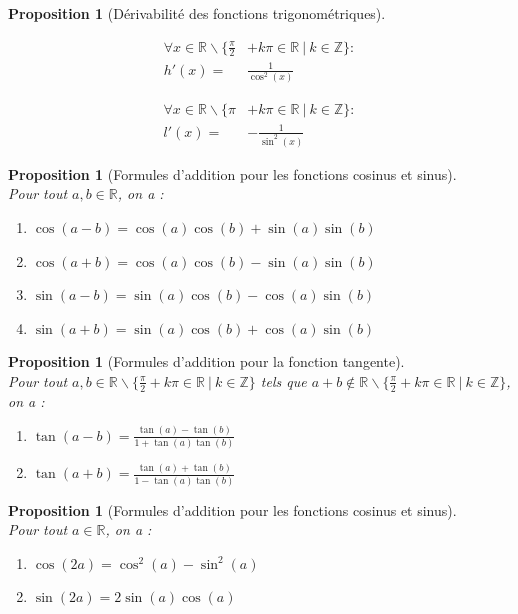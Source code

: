 \documentclass[a4paper,fontsize=13pt]{scrreprt}
\theoremstyle{plain}
\newtheorem{pro}[subsection]{Proposition}
\theoremstyle{definition}
\newcommand{\zz}{\mathbb{Z}}
\newcommand{\rr}{\mathbb{R}}
\begin{document}
\begin{pro} [Dérivabilité des fonctions trigonométriques]
\begin{enumerate}
\begin{multicols}{2}
		\item \begin{align*}
		\forall x \in \rr \backslash \{\frac{\pi}{2}&+k\pi \in \rr ~|~ k \in \zz \} :\\
		h'(x)=&\frac{1}{\cos^2(x)}
		\end{align*}
\item \begin{align*}
		\forall x \in \rr \backslash \{\pi&+k\pi \in \rr ~|~ k \in \zz \} :\\
		l'(x)=&-\frac{1}{\sin^2(x)}
		\end{align*}
	\end{multicols}
\end{enumerate}
\end{pro}

\begin{pro} [Formules d'addition pour les fonctions cosinus et sinus]~\\
Pour tout $a,b \in \rr$, on a :
\begin{enumerate}
\item $\cos(a-b) = \cos(a)\cos(b) + \sin(a)\sin(b)$
\item $\cos(a+b) = \cos(a)\cos(b) - \sin(a)\sin(b)$
\item $\sin(a-b) = \sin(a)\cos(b) - \cos(a)\sin(b)$
\item $\sin(a+b) = \sin(a)\cos(b) + \cos(a)\sin(b)$
\end{enumerate}
\end{pro}

\begin{pro} [Formules d'addition pour la fonction tangente]~\\
Pour tout $a,b \in \rr \backslash \{\frac{\pi}{2}+k\pi \in \rr~|~k \in \zz\}$ tels que $a+b \notin \rr \backslash \{\frac{\pi}{2}+k\pi \in \rr~|~k \in \zz\}$, on a :
\begin{enumerate}
\item $\tan(a-b) = \frac{\tan(a)-\tan(b)}{1+\tan(a)\tan(b)}$
\item $\tan(a+b) = \frac{\tan(a)+\tan(b)}{1-\tan(a)\tan(b)}$
\end{enumerate}
\end{pro}

\begin{pro} [Formules d'addition pour les fonctions cosinus et sinus] ~\\
Pour tout $a \in \rr$, on a :
\begin{enumerate}
\item $\cos(2a) = \cos^2(a) - \sin^2(a)$
\item $\sin(2a) = 2\sin(a)\cos(a)$
\end{enumerate}
\end{pro}
\end{document}
